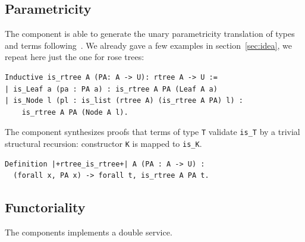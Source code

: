 \documentclass[sigplan,10pt,review]{acmart}\settopmatter{printfolios=true,printccs=false,printacmref=false}
\newcommand{\derive}[1]{\keys{#1}}
\begin{document}
\subsection{Parametricity} %

The \derive{pram1} component is able to generate the unary
parametricity translation of types and terms
following~\cite{keller:hal-00730913}. We already gave a few
examples in section~\ref{sec:idea}, we repeat here just the
one for rose trees:

\begin{minipage}{\textwidth}\begin{lstlisting}
Inductive is_rtree A (PA: A -> U): rtree A -> U :=
| is_Leaf a (pa : PA a) : is_rtree A PA (Leaf A a)
| is_Node l (pl : is_list (rtree A) (is_rtree A PA) l) :
    is_rtree A PA (Node A l).
\end{lstlisting}\end{minipage}

\noindent
The \derive{pram1P} component synthesizes proofs that terms
of type \lstinline+T+ validate \lstinline+is_T+ by a trivial
structural recursion: constructor \lstinline+K+ is mapped
to \lstinline+is_K+.

\begin{minipage}{\textwidth}\begin{lstlisting}
Definition |+rtree_is_rtree+| A (PA : A -> U) :
  (forall x, PA x) -> forall t, is_rtree A PA t.
\end{lstlisting}\end{minipage}



\subsection{Functoriality} %

The \derive{map} components implements a double service.
\end{document}
